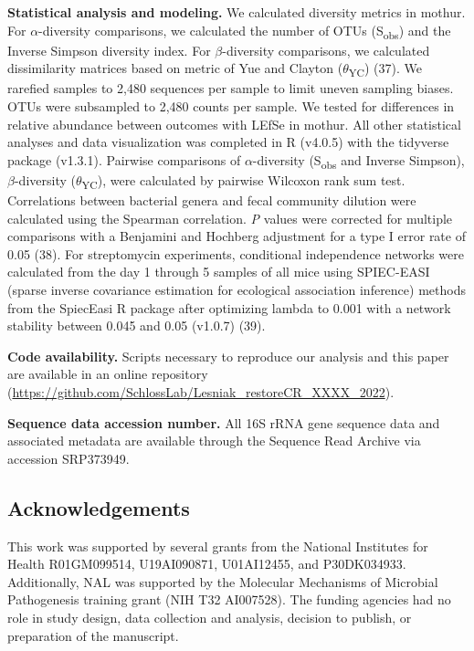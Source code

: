 \documentclass[
  12pt,
]{article}
\begin{document}
\textbf{Statistical analysis and modeling.} We calculated diversity
metrics in mothur. For \(\alpha\)-diversity comparisons, we calculated
the number of OTUs (S\textsubscript{obs}) and the Inverse Simpson
diversity index. For \(\beta\)-diversity comparisons, we calculated
dissimilarity matrices based on metric of Yue and Clayton
(\(\theta\)\textsubscript{YC}) (37). We rarefied samples to 2,480
sequences per sample to limit uneven sampling biases. OTUs were
subsampled to 2,480 counts per sample. We tested for differences in
relative abundance between outcomes with LEfSe in mothur. All other
statistical analyses and data visualization was completed in R (v4.0.5)
with the tidyverse package (v1.3.1). Pairwise comparisons of
\(\alpha\)-diversity (S\textsubscript{obs} and Inverse Simpson),
\(\beta\)-diversity (\(\theta\)\textsubscript{YC}), were calculated by
pairwise Wilcoxon rank sum test. Correlations between bacterial genera
and fecal community dilution were calculated using the Spearman
correlation. \emph{P} values were corrected for multiple comparisons
with a Benjamini and Hochberg adjustment for a type I error rate of 0.05
(38). For streptomycin experiments, conditional independence networks
were calculated from the day 1 through 5 samples of all mice using
SPIEC-EASI (sparse inverse covariance estimation for ecological
association inference) methods from the SpiecEasi R package after
optimizing lambda to 0.001 with a network stability between 0.045 and
0.05 (v1.0.7) (39).

\textbf{Code availability.} Scripts necessary to reproduce our analysis
and this paper are available in an online repository
(\url{https://github.com/SchlossLab/Lesniak_restoreCR_XXXX_2022}).

\textbf{Sequence data accession number.} All 16S rRNA gene sequence data
and associated metadata are available through the Sequence Read Archive
via accession SRP373949.

\hypertarget{acknowledgements}{%
\subsection{Acknowledgements}\label{acknowledgements}}

This work was supported by several grants from the National Institutes
for Health R01GM099514, U19AI090871, U01AI12455, and P30DK034933.
Additionally, NAL was supported by the Molecular Mechanisms of Microbial
Pathogenesis training grant (NIH T32 AI007528). The funding agencies had
no role in study design, data collection and analysis, decision to
publish, or preparation of the manuscript.
\end{document}
